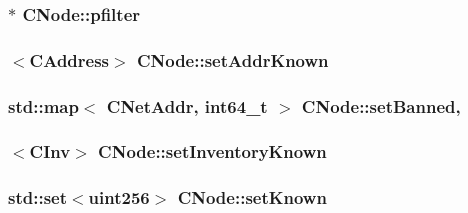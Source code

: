 \subsubsection[{pfilter}]{$\ast$ C\+Node\+::pfilter}\label{class_c_node_a2e28bf088e56fc9d30e99e9de6587743}
\hypertarget{class_c_node_ac21266ce880bd36b98ba7cfcc447a30f}{}
\subsubsection[{set\+Addr\+Known}]{$<${\bf C\+Address}$>$ C\+Node\+::set\+Addr\+Known}\label{class_c_node_ac21266ce880bd36b98ba7cfcc447a30f}
\hypertarget{class_c_node_adf22d1873c1012ab3edb8a52253b203e}{}
\subsubsection[{set\+Banned}]{\setlength{\rightskip}{0pt plus 5cm}std\+::map$<$ {\bf C\+Net\+Addr}, int64\+\_\+t $>$ C\+Node\+::set\+Banned\hspace{0.3cm}{\ttfamily [static]}, {\ttfamily [protected]}}\label{class_c_node_adf22d1873c1012ab3edb8a52253b203e}
\hypertarget{class_c_node_ae15aa9a971040800c26bc87b1250220f}{}
\subsubsection[{set\+Inventory\+Known}]{$<${\bf C\+Inv}$>$ C\+Node\+::set\+Inventory\+Known}\label{class_c_node_ae15aa9a971040800c26bc87b1250220f}
\hypertarget{class_c_node_ab1b30fa8e48005752f6b0bcf43eca478}{}
\subsubsection[{set\+Known}]{\setlength{\rightskip}{0pt plus 5cm}std\+::set$<${\bf uint256}$>$ C\+Node\+::set\+Known}\label{class_c_node_ab1b30fa8e48005752f6b0bcf43eca478}
\hypertarget{class_c_node_a6174b5a3d8d8f6a2daf02be3cf04dc63}{}
